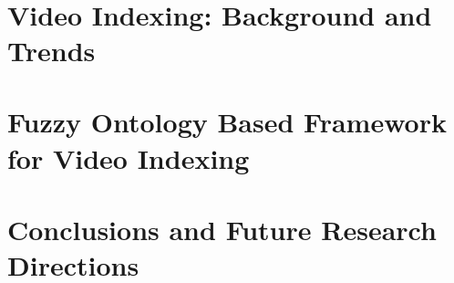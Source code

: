 \documentclass[a4paper,12pt,onecolumn,oneside]{regimthese}
\begin{document}
	\dominitoc
	\PagesCouverture
	\frontmatter{}
	
	\tablefancy
	
	
	
	

	\newpage ~

	\lestables		%
	
{}
	\mainmatter{}	%
	\regimfancy
			
	\regimfancy
	\part{Video Indexing: Background and Trends}
			
			
	\part{Fuzzy Ontology Based Framework for Video Indexing}
			
			
			
			
	\part{Conclusions and Future Research Directions}
			
\appendix








\bibliographyfancy




\newpage \pagestyle{empty} ~


\end{document}
